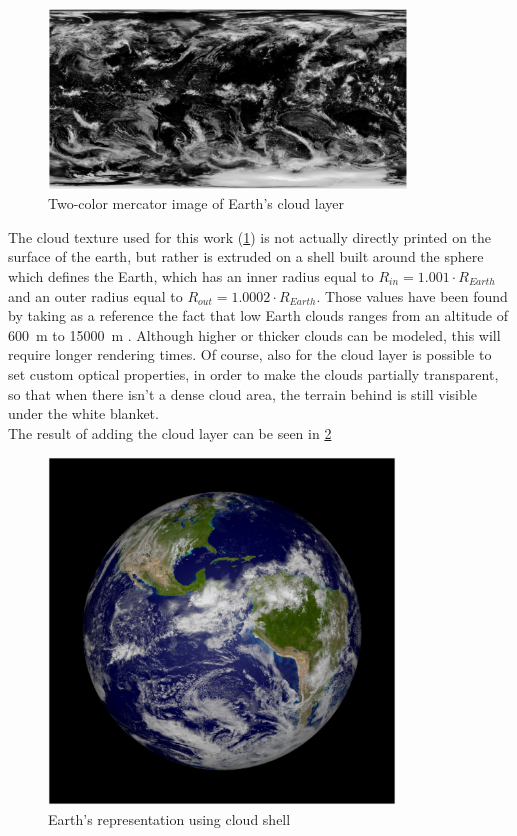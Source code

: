 \begin{figure}[htbp]
  \centering
  \includegraphics[width=0.85\textwidth]{gfx/clouds.eps}
  \caption{Two-color mercator image of Earth's cloud layer}
  \label{fig:cloudsMercator}
\end{figure}

The cloud texture used for this work (\ref{fig:cloudsMercator}) is not actually directly printed on the surface of the earth, but rather is extruded on a shell built around the sphere which defines the Earth, which has an inner radius equal to $R_{in} = 1.001 \cdot R_{Earth}$ and an outer radius equal to $R_{out} = 1.0002 \cdot  R_{Earth}$. Those values have been found by taking as a reference the fact that low Earth clouds ranges from an altitude of \SI{600}{\m} to \SI{15000}{\m} \cite{nimbostratus}. Although higher or thicker clouds can be modeled, this will require longer rendering times. Of course, also for the cloud layer is possible to set custom optical properties, in order to make the clouds partially transparent, so that when there isn't a dense cloud area, the terrain behind is still visible under the white blanket.\\
The result of adding the cloud layer can be seen in \ref{fig:cloudShell}

\begin{figure}[htbp]
  \centering
  \includegraphics[width=0.82\textwidth]{gfx/cloudShell.eps}
  \caption{Earth's representation using cloud shell}
  \label{fig:cloudShell}
\end{figure}

